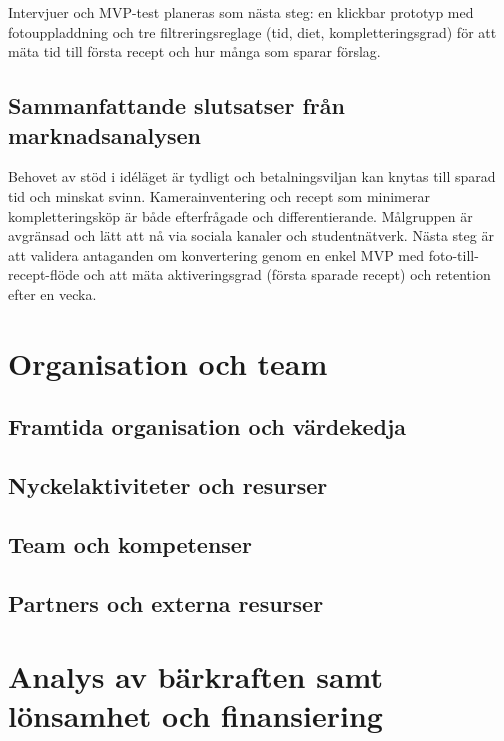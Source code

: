 \documentclass[a4paper,12pt]{article}
\begin{document}
Intervjuer och MVP-test planeras som nästa steg: en klickbar prototyp med fotouppladdning och tre filtreringsreglage (tid, diet, kompletteringsgrad) för att mäta tid till första recept och hur många som sparar förslag.


\subsection{Sammanfattande slutsatser från marknadsanalysen}

Behovet av stöd i idéläget är tydligt och betalningsviljan kan knytas till sparad tid och minskat svinn. Kamerainventering och recept som minimerar kompletteringsköp är både efterfrågade och differentierande. Målgruppen är avgränsad och lätt att nå via sociala kanaler och studentnätverk. Nästa steg är att validera antaganden om konvertering genom en enkel MVP med foto-till-recept-flöde och att mäta aktiveringsgrad (första sparade recept) och retention efter en vecka.


\section{Organisation och team}

\subsection{Framtida organisation och värdekedja}


\subsection{Nyckelaktiviteter och resurser}


\subsection{Team och kompetenser}


\subsection{Partners och externa resurser}


\section{Analys av bärkraften samt lönsamhet och finansiering}
\end{document}
